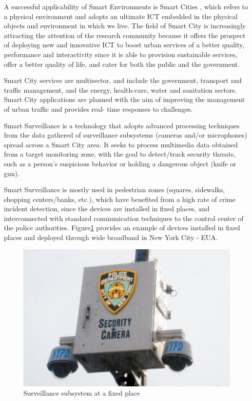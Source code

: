 A successful applicability of Smart Environments is Smart Cities \cite{Komninos2006}, which refers to a physical environment and adopts an ultimate ICT embedded in the physical objects and environment in which we live. The field of Smart City is increasingly attracting the attention of the research community because it offers the prospect of deploying new and innovative ICT to boost urban services of a better quality, performance and interactivity since it is able to provision sustainable services, offer a better quality of life, and cater for both the public and the government.

Smart City services are multisector, and include the government, transport and traffic management, and the energy, health-care, water and sanitation sectors. Smart City applications are planned with the aim of improving the management of urban traffic and provides real- time responses to challenges.

Smart Surveillance\cite{barros2014} is a technology that adopts advanced processing techniques from the data gathered of surveillance subsystems (cameras and/or microphones) spread across a Smart City area. It seeks to process multimedia data obtained from a target monitoring zone, with the goal to detect/track security threats, such as a person's suspicious behavior or holding a dangerous object (knife or gun).

Smart Surveillance is mostly used in pedestrian zones (squares, sidewalks, shopping centers/banks, etc.), which have benefited from a high rate of crime incident detection, since the devices are installed in fixed places, and interconnected with standard communication techniques to the control center of the police authorities. Figure\ref{fig:fixed} provides an example of devices installed in fixed places and deployed through wide broadband in New York City - EUA.

\begin{figure}[h!]
	\centering
   	\includegraphics[scale=0.45]{Imagens/intro_fixed.png}
	\caption{Surveillance subsystem at a fixed place}
	\label{fig:fixed}
\end{figure}

